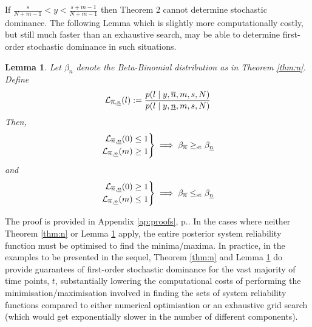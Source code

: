 \documentclass[12pt, a4paper]{elsarticle}
\newtheorem{lemma}[theorem]{Lemma}
\begin{document}
If $\frac{s}{N + m - 1} < y < \frac{s + m - 1}{N + m - 1}$ then 
Theorem 2 cannot determine stochastic dominance.  The following Lemma which is slightly
more computationally costly, but still much faster than an exhaustive search, may be able to determine first-order
stochastic dominance in such situations.
\begin{lemma}
  \label{lem:n}
  Let $\beta_n$ denote the Beta-Binomial distribution as in Theorem \ref{thm:n}.  Define
  \[ \mathcal{L}_{\overline{n},\underline{n}}(l) := \frac{p(l \mid y, \overline{n}, m, s, N)}{p(l \mid y, \underline{n}, m, s, N)} \]
  Then,
  \[ \left. \begin{aligned}
       \mathcal{L}_{\overline{n},\underline{n}}(0) \le 1 \\
       \mathcal{L}_{\overline{n},\underline{n}}(m) \ge 1 \\
    \end{aligned} \right\}
    \implies \beta_{\overline{n}} \ge_{\mathrm{st}} \beta_{\underline{n}} \]
  and
  \[ \left. \begin{aligned}
       \mathcal{L}_{\overline{n},\underline{n}}(0) \ge 1 \\
       \mathcal{L}_{\overline{n},\underline{n}}(m) \le 1 \\
    \end{aligned} \right\}
    \implies \beta_{\overline{n}} \le_{\mathrm{st}} \beta_{\underline{n}} \]
\end{lemma}
The proof is provided in Appendix \ref{ap:proofs}, p.\pageref{prf:n2}.
In the cases where neither Theorem \ref{thm:n} or Lemma \ref{lem:n} apply,
the entire posterior system reliability function must be optimised to 
find the minima/maxima.
In practice, in the examples to be presented in the sequel, Theorem 
\ref{thm:n} and Lemma \ref{lem:n} do provide guarantees of first-order
stochastic dominance for the vast majority of time points, $t$,
substantially lowering the computational costs of performing the
minimisation/maximisation involved in finding the sets of system 
reliability functions compared to either numerical optimisation or
an exhaustive grid search (which would get exponentially slower in 
the number of different components).
\end{document}
